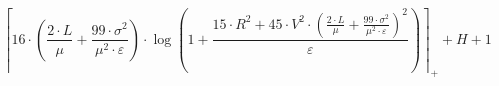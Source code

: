\[\left\lceil 16 \cdot \left(\frac{2 \cdot L}{\mu} + \frac{99 \cdot \sigma^{2}}{\mu^{2} \cdot \varepsilon}\right) \cdot \log\left(1 + \frac{15 \cdot R^{2} + 45 \cdot V^{2} \cdot \left(\frac{2 \cdot L}{\mu} + \frac{99 \cdot \sigma^{2}}{\mu^{2} \cdot \varepsilon}\right)^{2}}{\varepsilon}\right) \right\rceil_{+} + H + 1\]
